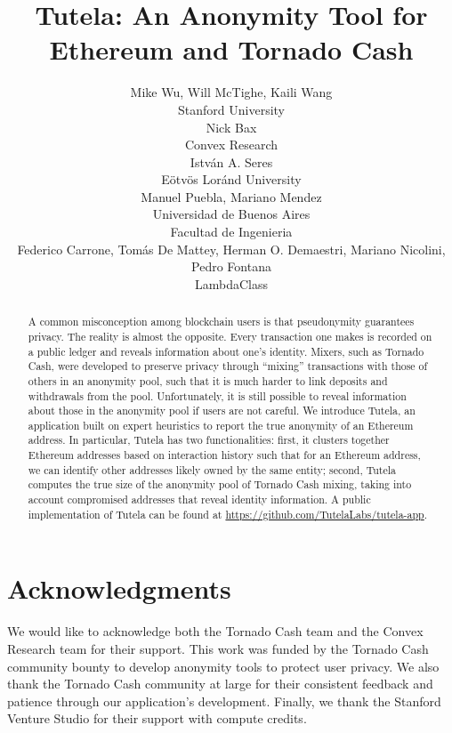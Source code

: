 \documentclass[11pt,a4paper]{article}
\title{Tutela: An Anonymity Tool for Ethereum and Tornado Cash}
\author{
  \small{Mike Wu, Will McTighe, Kaili Wang}\\
  \small{Stanford University} \\ \And
  \small{Nick Bax} \\
  \small{Convex Research} \\ \And
  \small{Istv\'{a}n A. Seres} \\
  \small{E\"{o}tv\"{o}s Lor\'{a}nd University} \\ \AND
  \small{Manuel Puebla, Mariano Mendez}\\
  \small{Universidad de Buenos Aires}\\
  \small{Facultad de Ingenieria}\\ \AND
  \small{Federico Carrone, Tomás De Mattey,  Herman O. Demaestri, Mariano Nicolini, Pedro Fontana} \\
  \small{LambdaClass} \\}
\date{}
\begin{document}
\maketitle
\begin{abstract}
A common misconception among blockchain users is that pseudonymity guarantees privacy. The reality is almost the opposite. Every transaction one makes is recorded on a public ledger and reveals information about one's identity.
Mixers, such as Tornado Cash, were developed to preserve privacy through ``mixing'' transactions with those of others in an anonymity pool, such that it is much harder to link deposits and withdrawals from the pool. Unfortunately, it is still possible to reveal information about those in the anonymity pool if users are not careful.
We introduce Tutela, an application built on expert heuristics to report the true anonymity of an Ethereum address.
In particular, Tutela has two functionalities: first, it clusters together Ethereum addresses based on interaction history such that for an Ethereum address, we can identify other addresses likely owned by the same entity; second, Tutela computes the true size of the anonymity pool of Tornado Cash mixing, taking into account compromised addresses that reveal identity information. A public implementation of Tutela can be found at \url{https://github.com/TutelaLabs/tutela-app}.
\end{abstract}










\section*{Acknowledgments}
We would like to acknowledge both the Tornado Cash team and the Convex Research team for their support. This work was funded by the Tornado Cash community bounty to develop anonymity tools to protect user privacy. We also thank the Tornado Cash community at large for their consistent feedback and patience through our application's development. Finally, we thank the Stanford Venture Studio for their support with compute credits.

\appendix




\end{document}
